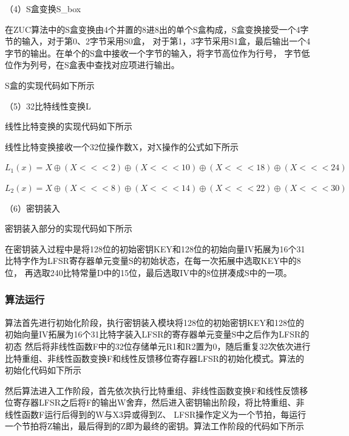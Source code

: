 \documentclass[a4paper,11pt,UTF8]{ctexart}
\begin{document}
      （4）S盒变换S\_box\par
        在ZUC算法中的S盒变换由4个并置的8进8出的单个S盒构成，S盒变换接受一个4字节的输入，对于第0、2字节采用S0盒，
        对于第1，3字节采用S1盒，最后输出一个4字节的输出。在单个的S盒中接收一个字节的输入，将字节高位作为行号，
        字节低位作为列号，在S盒表中查找对应项进行输出。\par
        S盒的实现代码如下所示
        \par

      （5）32比特线性变换L\par
        线性比特变换的实现代码如下所示
        \par
        线性比特变换接收一个32位操作数X，对X操作的公式如下所示\par
        $L_{1}(x)=X\oplus (X<<<2)\oplus (X<<<10)\oplus (X<<<18)\oplus (X<<<24)$\par
        $L_{2}(x)=X\oplus (X<<<8)\oplus (X<<<14)\oplus (X<<<22)\oplus (X<<<30)$\par

      （6）密钥装入\par
        密钥装入部分的实现代码如下所示
        \par
        在密钥装入过程中是将128位的初始密钥KEY和128位的初始向量IV拓展为16个31比特字作为LFSR寄存器单元变量S的初始状态，在每一次拓展中选取KEY中的8位，
        再选取240比特常量D中的15位，最后选取IV中的8位拼凑成S中的一项。

    \subsubsection{算法运行} 
      算法首先进行初始化阶段，执行密钥装入模块将128位的初始密钥KEY和128位的初始向量IV拓展为16个31比特字装入LFSR的寄存器单元变量S中之后作为LFSR的初态
      然后将非线性函数F中的32位存储单元R1和R2置为0，随后重复32次依次进行比特重组、非线性函数变换F和线性反馈移位寄存器LFSR的初始化模式。算法的初始化代码如下所示
      \par
      然后算法进入工作阶段，首先依次执行比特重组、非线性函数变换F和线性反馈移位寄存器LFSR之后将F的输出W舍弃，然后进入密钥输出阶段，将比特重组、非线性函数F运行后得到的W与X3异或得到Z、
      LFSR操作定义为一个节拍，每运行一个节拍将Z输出，最后得到的Z即为最终的密钥。算法工作阶段的代码如下所示
      \par
\end{document}
